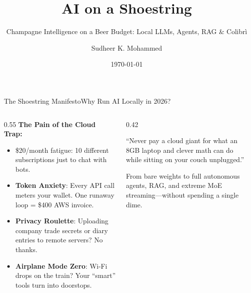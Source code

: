 \documentclass[10pt,aspectratio=169]{beamer}
\title{AI on a Shoestring}
\subtitle{Champagne Intelligence on a Beer Budget: Local LLMs, Agents, RAG \& Colibr\`i}
\date{\today}
\author{Sudheer K. Mohammed}
\institute{BARC}
\begin{document}
\maketitle

\begin{frame}{The Shoestring Manifesto}{Why Run AI Locally in 2026?}
    \begin{columns}[T]
        \begin{column}{0.55\textwidth}
            \textbf{The Pain of the Cloud Trap:}
            \begin{itemize}
                \item \alert{\$20/month fatigue}: 10 different subscriptions just to chat with bots.
                \item \textbf{Token Anxiety}: Every API call meters your wallet. One runaway loop = \$400 AWS invoice.
                \item \textbf{Privacy Roulette}: Uploading company trade secrets or diary entries to remote servers? No thanks.
                \item \textbf{Airplane Mode Zero}: Wi-Fi drops on the train? Your ``smart'' tools turn into doorstops.
            \end{itemize}
        \end{column}
        \begin{column}{0.42\textwidth}
            \begin{tcolorbox}[colback=ShoeAccent!10, colframe=ShoeAccent, title=\textbf{Shoestring Rule \#1}]
                \small
                ``Never pay a cloud giant for what an 8GB laptop and clever math can do while sitting on your couch unplugged.''
            \end{tcolorbox}
            \vspace{0.2cm}
            \begin{tcolorbox}[colback=ShoeTeal!10, colframe=ShoeTeal, title=\textbf{Our Goal Today}]
                \small
                From bare weights to full autonomous agents, RAG, and extreme MoE streaming---without spending a single dime.
            \end{tcolorbox}
        \end{column}
    \end{columns}
\end{frame}
\end{document}
